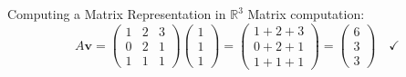 \documentclass[12pt,a4paper]{article}
\newcommand{\R}{\mathbb{R}}
\newcommand{\vv}[1]{\mathbf{#1}}
\begin{document}
\begin{example}{Computing a Matrix Representation in $\R^3$}
		Matrix computation: 
		\[
		A\vv{v} = \begin{pmatrix} 1 & 2 & 3 \\ 0 & 2 & 1 \\ 1 & 1 & 1 \end{pmatrix} \begin{pmatrix} 1 \\ 1 \\ 1 \end{pmatrix} = \begin{pmatrix} 1 + 2 + 3 \\ 0 + 2 + 1 \\ 1 + 1 + 1 \end{pmatrix} = \begin{pmatrix} 6 \\ 3 \\ 3 \end{pmatrix} \quad \checkmark
		\]
	\end{example}
	
\end{document}
